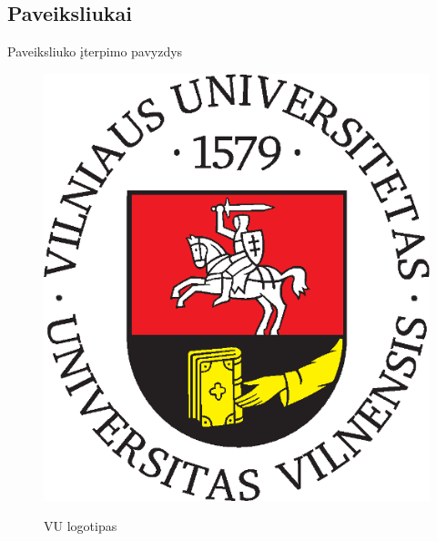 \documentclass{beamer}
\begin{document}
\subsection{Paveiksliukai}
\begin{frame}{Paveiksliuko įterpimo pavyzdys}
\begin{figure}[!htbp]
    \includegraphics[scale=0.43]{vu_logo}
    \label{fig:vu logo}

    \caption{VU logotipas}
\end{figure}
\end{frame}
\end{document}
